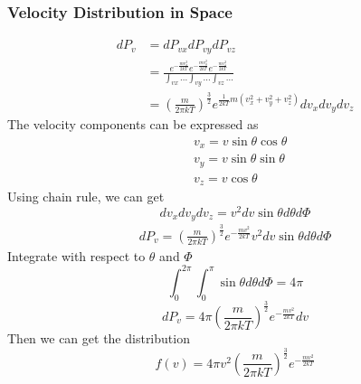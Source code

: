 \documentclass[letterpaper]{article}
\begin{document}
\subsubsection*{Velocity Distribution in Space}
\begin{equation*}
    \begin{aligned}
        dP_v&=dP_{vx}dP_{vy}dP_{vz}\\
        &=\frac{e^{-\frac{mv_x^2}{2kT}}e^{-\frac{mv_y^2}{2kT}}e^{-\frac{mv_z^2}{2kT}}}
        {\int_{vx}...\int_{vy}...\int_{vz}...}\\
        &=(\frac{m}{2\pi kT})^{\frac{3}{2}}e^{\frac{1}{2kT}m(v_x^2+v_y^2+v_z^2)}
        dv_xdv_ydv_z
    \end{aligned}
\end{equation*}
The velocity components can be expressed as
\begin{equation*}
    \begin{aligned}
        &v_x=v\sin\theta\cos\theta\\
        &v_y=v\sin\theta\sin\theta\\
        &v_z=v\cos\theta
    \end{aligned}
\end{equation*}
Using chain rule, we can get
\begin{equation*}
    dv_xdv_ydv_z=v^2dv\sin\theta d\theta d\Phi
\end{equation*}
\begin{equation*}
    \begin{aligned}
        dP_v=(\frac{m}{2\pi kT})^{\frac{3}{2}}e^{-\frac{mv^2}{2kT}}v^2dv\sin\theta d\theta d\Phi
    \end{aligned}
\end{equation*}
Integrate with respect to $\theta$ and $\Phi$
\begin{equation*}
    \int_{0}^{2\pi}\int_{0}^{\pi}\sin\theta d\theta d\Phi=4\pi
\end{equation*}
\begin{equation*}
    dP_v=4\pi(\frac{m}{2\pi kT})^{\frac{3}{2}}e^{-\frac{mv^2}{2kT}}dv
\end{equation*}
Then we can get the distribution
\begin{equation*}
    f(v)=4\pi v^2(\frac{m}{2\pi kT})^{\frac{3}{2}}e^{-\frac{mv^2}{2kT}}
\end{equation*}
\end{document}
